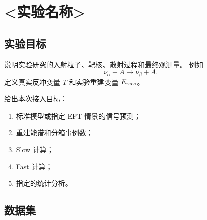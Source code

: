 %
%
%

\providecommand{\dd}{\mathrm d}
\providecommand{\eV}{\mathrm{eV}}
\providecommand{\keV}{\mathrm{keV}}
\providecommand{\MeV}{\mathrm{MeV}}
\providecommand{\eVee}{\mathrm{eV_{ee}}}
\providecommand{\keVee}{\mathrm{keV_{ee}}}
\providecommand{\keVnr}{\mathrm{keV_{nr}}}
\providecommand{\cm}{\mathrm{cm}}
\providecommand{\kgday}{\mathrm{kg\,day}}
\providecommand{\code}[1]{\texttt{#1}}

\section{<实验名称>}
\label{sec:<experiment-label>}

\subsection{实验目标}

说明实验研究的入射粒子、靶核、散射过程和最终观测量。
例如
\begin{equation}
  \nu_\alpha + A
  \longrightarrow
  \nu_\beta + A.
\end{equation}
定义真实反冲变量 $T$ 和实验重建变量 $E_{\rm reco}$。

给出本次接入目标：
\begin{enumerate}
  \item 标准模型或指定 EFT 情景的信号预测；
  \item 重建能谱和分箱事例数；
  \item Slow 计算；
  \item Fast 计算；
  \item 指定的统计分析。
\end{enumerate}

\subsection{数据集}

